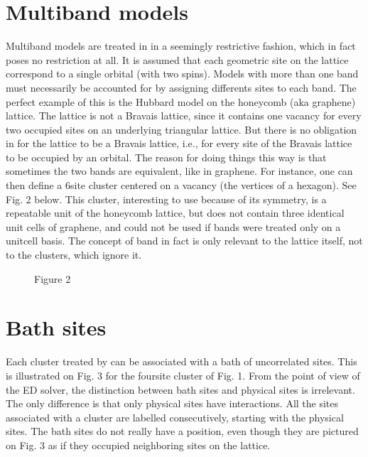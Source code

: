 \documentclass[letterpaper,10pt,english]{sphinxmanual}
\let\sphinxpxdimen\pdfpxdimen\else\newdimen\sphinxpxdimen
\begin{document}
\section{Multiband models}
\label{\detokenize{models:multiband-models}}
\sphinxAtStartPar
Multiband models are treated in  in a seemingly restrictive fashion, which in fact poses no restriction at all. It is assumed that each geometric site on the lattice correspond to a single orbital (with two spins). Models with more than one band must necessarily be accounted for by assigning differents sites to each band. The perfect example of this is the Hubbard model on the honeycomb (aka graphene) lattice.  The lattice is not a Bravais lattice, since it contains one vacancy for every two occupied sites on an underlying triangular lattice. But there is no obligation in  for the lattice to be a Bravais lattice, i.e., for every site of the Bravais lattice to be occupied by an orbital.
The reason for doing things this way is that sometimes the two bands are equivalent, like in graphene. For instance, one can then define a 6\sphinxhyphen{}site cluster centered on a vacancy (the vertices of a hexagon). See Fig. 2 below. This cluster, interesting to use because of its symmetry, is a repeatable unit of the honeycomb lattice, but does not contain three identical unit cells of graphene, and could not be used if bands were treated only on a unit\sphinxhyphen{}cell basis.
The concept of band in fact is only relevant to the lattice itself, not to the clusters, which ignore it.

\begin{figure}[htbp]
\centering
\capstart

\noindent\sphinxincludegraphics[height=300\sphinxpxdimen]{{hexa6}.png}
\caption{Figure 2}\label{\detokenize{models:id2}}\end{figure}


\section{Bath sites}
\label{\detokenize{models:bath-sites}}
\sphinxAtStartPar
Each cluster treated by  can be associated with a bath of uncorrelated sites. This is illustrated on Fig. 3 for the four\sphinxhyphen{}site cluster of Fig. 1. From the point of view of the ED solver, the distinction between bath sites and physical sites is irrelevant. The only difference is that only physical sites have interactions. All the sites associated with a cluster are labelled consecutively, starting with the physical sites.
The bath sites do not really have a position, even though they are pictured on Fig. 3 as if they occupied neighboring sites on the lattice.
\end{document}

